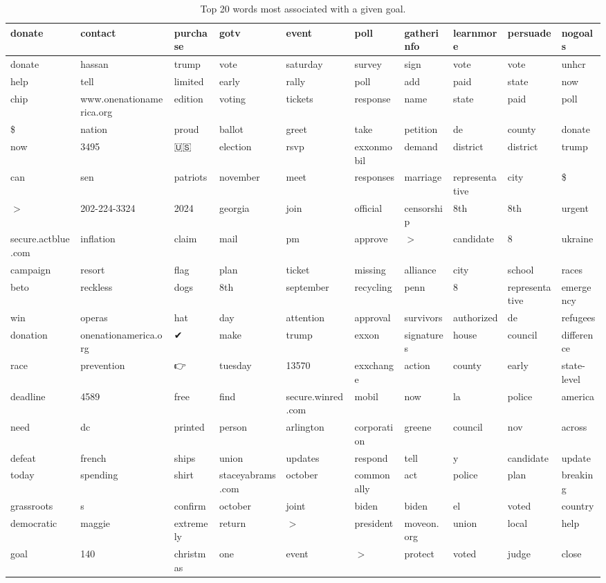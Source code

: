 \begin{table}[ht]
\centering
\scriptsize
\begin{tabular}{llllllllll}
  \hline
donate & contact & purchase & gotv & event & poll & gatherinfo & learnmore & persuade & nogoals \\ 
  \hline
donate & hassan & trump & vote & saturday & survey & sign & vote & vote & unhcr \\ 
  help & tell & limited & early & rally & poll & add & paid & state & now \\ 
  chip & www.onenationamerica.org & edition & voting & tickets & response & name & state & paid & poll \\ 
  \$ & nation & proud & ballot & greet & take & petition & de & county & donate \\ 
  now & 3495 & 🇺🇸 & election & rsvp & exxonmobil & demand & district & district & trump \\ 
  can & sen & patriots & november & meet & responses & marriage & representative & city & \$ \\ 
  $>$ & 202-224-3324 & 2024 & georgia & join & official & censorship & 8th & 8th & urgent \\ 
  secure.actblue.com & inflation & claim & mail & pm & approve & $>$ & candidate & 8 & ukraine \\ 
  campaign & resort & flag & plan & ticket & missing & alliance & city & school & races \\ 
  beto & reckless & dogs & 8th & september & recycling & penn & 8 & representative & emergency \\ 
  win & operas & hat & day & attention & approval & survivors & authorized & de & refugees \\ 
  donation & onenationamerica.org & ✔ & make & trump & exxon & signatures & house & council & difference \\ 
  race & prevention & 👉 & tuesday & 13570 & exxchange & action & county & early & state-level \\ 
  deadline & 4589 & free & find & secure.winred.com & mobil & now & la & police & america \\ 
  need & dc & printed & person & arlington & corporation & greene & council & nov & across \\ 
  defeat & french & ships & union & updates & respond & tell & y & candidate & update \\ 
  today & spending & shirt & staceyabrams.com & october & commonally & act & police & plan & breaking \\ 
  grassroots & s & confirm & october & joint & biden & biden & el & voted & country \\ 
  democratic & maggie & extremely & return & $>$ & president & moveon.org & union & local & help \\ 
  goal & 140 & christmas & one & event & $>$ & protect & voted & judge & close \\ 
   \hline
\end{tabular}
\caption{Top 20 words most associated with a given goal.} 
\label{tab:fightin_words}
\end{table}
